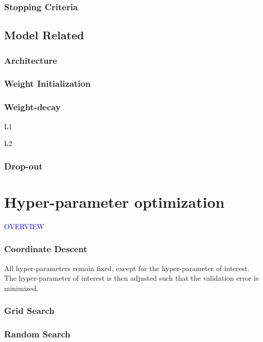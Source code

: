 \subsubsection{Stopping Criteria}

\subsection{Model Related}

\subsubsection{Architecture}

\subsubsection{Weight Initialization}

\subsubsection{Weight-decay}

L1

L2

\subsubsection{Drop-out}

\section{Hyper-parameter optimization}

\textcolor{blue}{OVERVIEW}

\subsubsection{Coordinate Descent}

All hyper-parameters remain fixed, except for the hyper-parameter of interest. The hyper-parameter of interest is then adjusted such that the validation error is minimized.

\subsubsection{Grid Search}

\subsubsection{Random Search}

